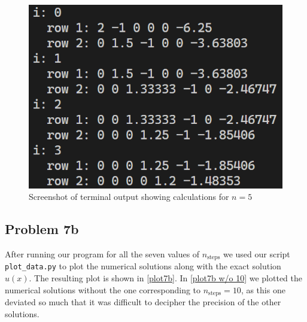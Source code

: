 \documentclass[english,notitlepage]{revtex4-1}  %
\begin{document}
\begin{figure}
    \centering
    \includegraphics[scale=0.5]{vector_example.png}
    \caption{Screenshot of terminal output showing calculations for $n = 5$}
    \label{fig: vector_example}
\end{figure}

\subsection*{Problem 7b}
After running our program for all the seven values of $n_\text{steps}$ we used our script \verb|plot_data.py| to plot the numerical solutions along with the exact solution $u(x)$. The resulting plot is shown in \cref{plot7b}. In \cref{plot7b w/o 10} we plotted the numerical solutions without the one corresponding to $n_\text{steps} = 10$, as this one deviated so much that it was difficult to decipher the precision of the other solutions.
\end{document}
